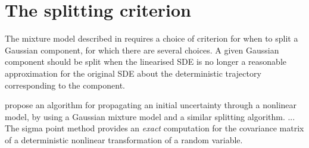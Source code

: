 \section{The splitting criterion}
The mixture model described in  requires a choice of criterion for when to split a Gaussian component, for which there are several choices.
A given Gaussian component should be split when the linearised SDE is no longer a reasonable approximation for the original SDE about the deterministic trajectory corresponding to the component.



\citet{DeMarsEtAl_2013_EntropyBasedApproachUncertainty} propose an algorithm for propagating an initial uncertainty through a nonlinear model, by using a Gaussian mixture model and a similar splitting algorithm.
... The sigma point method provides an \emph{exact} computation for the covariance matrix of a deterministic nonlinear transformation of a random variable.









